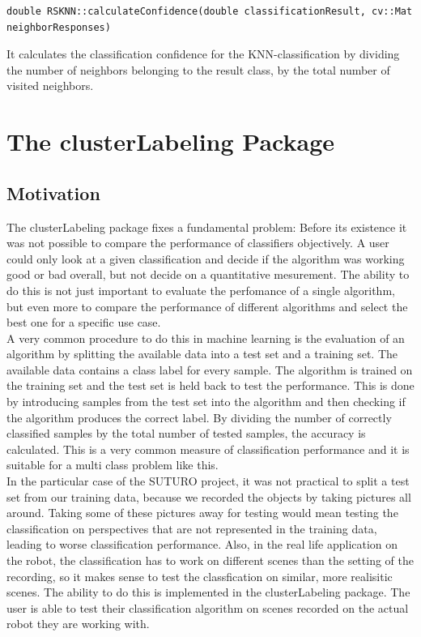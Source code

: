 \documentclass[main.tex]{subfiles}
\begin{document}
\begin{lstlisting}
double RSKNN::calculateConfidence(double classificationResult, cv::Mat neighborResponses)
\end{lstlisting}

It calculates the classification confidence for the KNN-classification by dividing the number of neighbors belonging to the result class, by the total number of visited neighbors. 

\section{The clusterLabeling Package}
\subsection{Motivation}
The clusterLabeling package fixes a fundamental problem: Before its existence it was not possible to compare the performance of classifiers objectively. A user could only look at a given classification and decide if the algorithm was working good or bad overall, but not decide on a quantitative mesurement. The ability to do this is not just important to evaluate the perfomance of a single algorithm, but even more to compare the performance of different algorithms and select the best one for a specific use case.\\

A very common procedure to do this in machine learning is the evaluation of an algorithm by splitting the available data into a test set and a training set. The available data contains a class label for every sample. The algorithm is trained on the training set and the test set is held back to test the performance. This is done by introducing samples from the test set into the algorithm and then checking if the algorithm produces the correct label. By dividing the number of correctly classified samples by the total number of tested samples, the accuracy is calculated. This is a very common measure of classification performance and it is suitable for a multi class problem like this.\\

In the particular case of the SUTURO project, it was not practical to split a test set from our training data, because we recorded the objects by taking pictures all around. Taking some of these pictures away for testing would mean testing the classification on perspectives that are not represented in the training data, leading to worse classification performance. Also, in the real life application on the robot, the classification has to work on different scenes than the setting of the recording, so it makes sense to test the classfication on similar, more realisitic scenes. The ability to do this is implemented in the clusterLabeling package. The user is able to test their classification algorithm on scenes recorded on the actual robot they are working with.  
\end{document}
